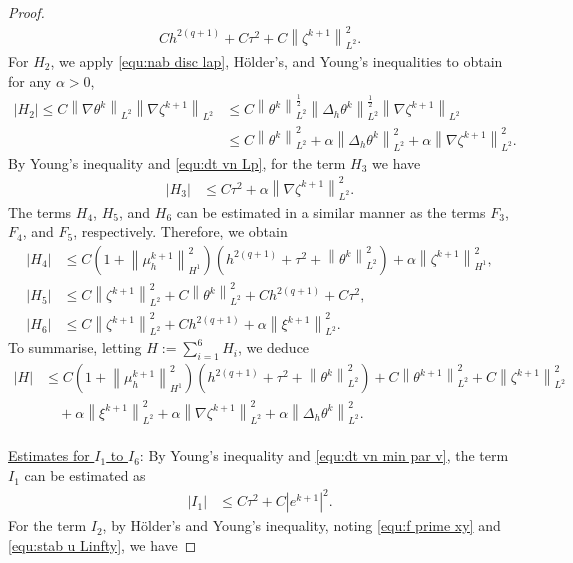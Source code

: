 \documentclass[11pt, reqno]{amsart}
\theoremstyle{definition}
\numberwithin{equation}{section}
\newcommand{\norm}[2]{\left\|{#1}\right\|_{#2}}
\newcommand{\abs}[1]{\left|{#1}\right|}
\begin{document}
\begin{proof}
\begin{align*}
	Ch^{2(q+1)} + C\tau^2 + C\norm{\zeta^{k+1}}{L^2}^2.
\end{align*}
For $H_2$, we apply \eqref{equ:nab disc lap}, H\"older's, and Young's inequalities to obtain for any $\alpha>0$,
\begin{align*}
	\abs{H_2}
	\leq
	C \norm{\nabla\theta^k}{L^2} \norm{\nabla \zeta^{k+1}}{L^2}
	&\leq
	C \norm{\theta^k}{L^2}^{\frac12} \norm{\Delta_h \theta^k}{L^2}^{\frac12} \norm{\nabla \zeta^{k+1}}{L^2}
	\\
	&\leq
	C\norm{\theta^k}{L^2}^2 + \alpha \norm{\Delta_h \theta^k}{L^2}^2 + \alpha \norm{\nabla \zeta^{k+1}}{L^2}^2.
\end{align*}
By Young's inequality and \eqref{equ:dt vn Lp}, for the term $H_3$ we have
\begin{align*}
	\abs{H_3}
	&\leq
	C\tau^2 +\alpha \norm{\nabla \zeta^{k+1}}{L^2}^2.
\end{align*}
The terms $H_4$, $H_5$, and $H_6$ can be estimated in a similar manner as the terms $F_3$, $F_4$, and $F_5$, respectively. Therefore, we obtain
\begin{align*}
	\abs{H_4}
	&\leq
	C\left(1+\norm{\mu_h^{k+1}}{H^1}^2\right) \left(h^{2(q+1)}+ \tau^2+ \norm{\theta^k}{L^2}^2 \right)
	+
	\alpha \norm{\zeta^{k+1}}{H^1}^2,
	\\
	\abs{H_5}
	&\leq
	C \norm{\zeta^{k+1}}{L^2}^2 + C \norm{\theta^k}{L^2}^2 + Ch^{2(q+1)} + C\tau^2,
	\\
	\abs{H_6}
	&\leq
	C\norm{\zeta^{k+1}}{L^2}^2 + Ch^{2(q+1)} + \alpha \norm{\xi^{k+1}}{L^2}^2.
\end{align*}
To summarise, letting $H:= \sum_{i=1}^6 H_i$, we deduce
\begin{align}\label{equ:est H}
	\abs{H} &\leq
	C\left(1+\norm{\mu_h^{k+1}}{H^1}^2\right) \left(h^{2(q+1)}+ \tau^2+ \norm{\theta^k}{L^2}^2 \right)
	+
	C \norm{\theta^{k+1}}{L^2}^2
	+
	C \norm{\zeta^{k+1}}{L^2}^2
	\nonumber\\
	&\quad
	+
	\alpha \norm{\xi^{k+1}}{L^2}^2
	+
	\alpha \norm{\nabla \zeta^{k+1}}{L^2}^2
	+
	\alpha \norm{\Delta_h \theta^k}{L^2}^2.
\end{align}
\\
\underline{Estimates for $I_1$ to $I_6$}: By Young's inequality and \eqref{equ:dt vn min par v}, the term $I_1$ can be estimated as
\begin{align*}
	\abs{I_1} &\leq
	C\tau^2 + C\abs{e^{k+1}}^2.
\end{align*}
For the term $I_2$, by H\"older's and Young's inequality, noting \eqref{equ:f prime xy} and \eqref{equ:stab u Linfty}, we have

\end{proof}
\end{document}
